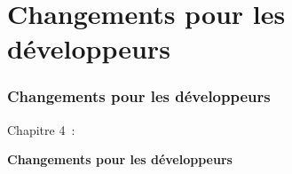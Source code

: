 %

\section{Changements pour les développeurs}
\begin{frame}[fragile]
	\frametitle{Changements pour les développeurs}

	\begin{center}\huge{Chapitre 4~:}\end{center}
	\begin{center}\huge{\color{typo3darkgrey}\textbf{Changements pour les développeurs}}\end{center}

\end{frame}

